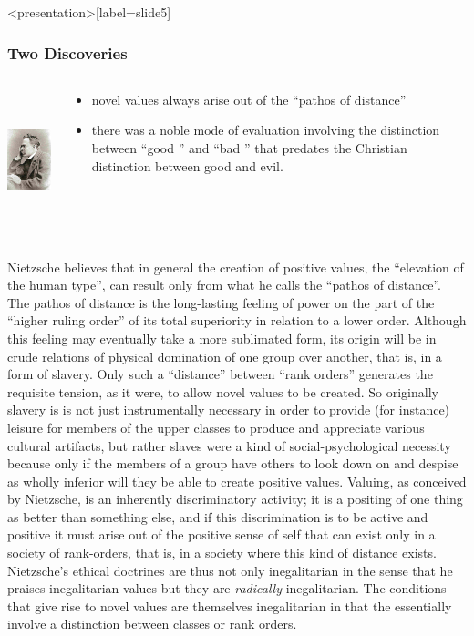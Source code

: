 \begin{frame}<presentation>[label=slide5]
    \frametitle{Two Discoveries}
        \begin{columns}
            \begin{column}{3cm}
                \includegraphics[height=4cm]{../../graphics/nietzsche.jpg}
            \end{column}
            \begin{column}{7cm}
                \begin{itemize}
                	\item novel values always arise out of the ``pathos of distance'' 
                	\item there was a noble mode of evaluation involving the distinction between ``good '' and  ``bad '' that predates the Christian distinction between good and evil.
                \end{itemize}
            \end{column}
        \end{columns}
\end{frame}

Nietzsche believes that in general the creation of positive values, the  ``elevation of the human type'', can result only from what he calls the  ``pathos of distance''. The pathos of distance is the long-lasting feeling of power on the part of the  ``higher ruling order'' of its total superiority in relation to a lower order. Although this feeling may eventually take a more sublimated form, its origin will be in crude relations of physical domination of one group over another, that is, in a form of slavery. Only such a  ``distance'' between  ``rank orders'' generates the requisite tension, as it were, to allow novel values to be created. So originally slavery is is not just instrumentally necessary in order to provide (for instance) leisure for members of the upper classes to produce and appreciate various cultural artifacts, but rather slaves were a kind of social-psychological necessity because only if the members of a group have others to look down on and despise as wholly inferior will they be able to create positive values. Valuing, as conceived by Nietzsche, is an inherently discriminatory activity; it is a positing of one thing as better than something else, and if this discrimination is to be active and positive it must arise out of the positive sense of self that can exist only in a society of rank-orders, that is, in a society where this kind of distance exists. Nietzsche's ethical doctrines are thus not only inegalitarian in the sense that he praises inegalitarian values but they are \emph{radically} inegalitarian. The conditions that give rise to novel values are themselves inegalitarian in that the essentially involve a distinction between classes or rank orders.

